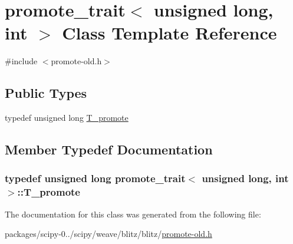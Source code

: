 \hypertarget{classpromote__trait_3_01unsigned_01long_00_01int_01_4}{}\section{promote\+\_\+trait$<$ unsigned long, int $>$ Class Template Reference}
\label{classpromote__trait_3_01unsigned_01long_00_01int_01_4}


{\ttfamily \#include $<$promote-\/old.\+h$>$}

\subsection*{Public Types}
\begin{DoxyCompactItemize}
\item 
typedef unsigned long \hyperlink{classpromote__trait_3_01unsigned_01long_00_01int_01_4_a3c7c5d64e7dea3ae5c9b004131ef391f}{T\+\_\+promote}
\end{DoxyCompactItemize}


\subsection{Member Typedef Documentation}
\hypertarget{classpromote__trait_3_01unsigned_01long_00_01int_01_4_a3c7c5d64e7dea3ae5c9b004131ef391f}{}
\subsubsection[{T\+\_\+promote}]{\setlength{\rightskip}{0pt plus 5cm}typedef unsigned long {\bf promote\+\_\+trait}$<$ unsigned long, int $>$\+::{\bf T\+\_\+promote}}\label{classpromote__trait_3_01unsigned_01long_00_01int_01_4_a3c7c5d64e7dea3ae5c9b004131ef391f}


The documentation for this class was generated from the following file\+:\begin{DoxyCompactItemize}
\item 
packages/scipy-\/0../scipy/weave/blitz/blitz/\hyperlink{promote-old_8h}{promote-\/old.\+h}\end{DoxyCompactItemize}
